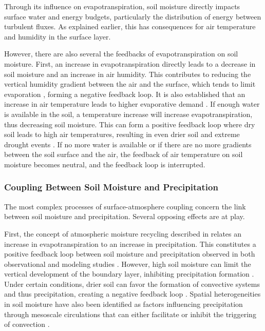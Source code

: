 Through its influence on evapotranspiration, soil moisture directly impacts surface water and energy budgets, particularly the distribution of energy between turbulent fluxes. As explained earlier, this has consequences for air temperature and humidity in the surface layer.

However, there are also several the feedbacks of evapotranspiration on soil moisture. First, an increase in evapotranspiration directly leads to a decrease in soil moisture and an increase in air humidity. This contributes to reducing the vertical humidity gradient between the air and the surface, which tends to limit evaporation \citep{allen_crop_2000}, forming a negative feedback loop. It is also established that an increase in air temperature leads to higher evaporative demand \citep{jarvis_stomatal_1986}. If enough water is available in the soil, a temperature increase will increase evapotranspiration, thus decreasing soil moisture. This can form a positive feedback loop where dry soil leads to high air temperatures, resulting in even drier soil and extreme drought events \citep{quesada_asymmetric_2012}. If no more water is available or if there are no more gradients between the soil surface and the air, the feedback of air temperature on soil moisture becomes neutral, and the feedback loop is interrupted.

\subsubsection*{Coupling Between Soil Moisture and Precipitation}

The most complex processes of surface-atmosphere coupling concern the link between soil moisture and precipitation. Several opposing effects are at play.

First, the concept of atmospheric moisture recycling described in \citet{eltahir_precipitation_1996} relates an increase in evapotranspiration to an increase in precipitation. This constitutes a positive feedback loop between soil moisture and precipitation observed in both observational and modeling studies \citep{koster_observational_2003, guo_glace_2006, wei_dissecting_2012, findell_probability_2011}. However, high soil moisture can limit the vertical development of the boundary layer, inhibiting precipitation formation \citep{findell_atmospheric_2003-1, ek_influence_2004}. Under certain conditions, drier soil can favor the formation of convective systems and thus precipitation, creating a negative feedback loop \citep{klein_dry_2020}. Spatial heterogeneities in soil moisture have also been identified as factors influencing precipitation through mesoscale circulations that can either facilitate or inhibit the triggering of convection \citep{findell_atmospheric_2003, taylor_frequency_2011, rochetin_morphology_2017}.

